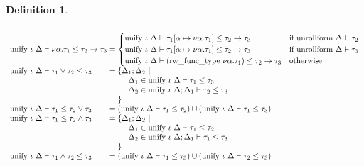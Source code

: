 \documentclass[manuscript]{acmart}
\theoremstyle{definition}
\newtheorem{definition}{Definition}[section]
\begin{document}
\begin{definition}
\[\begin{array}{l @{} l}
    \\
    \text{unify } \iota\ \Delta \vdash
    \nu \alpha . \tau_1 \leq 
    \tau_2 \rightarrow \tau_3
    &{} = 
    \begin{cases}
      \text{unify } \iota\ \Delta \vdash
      \tau_1[\alpha\mapsto\nu\alpha.\tau_1]
      \leq 
      \tau_2 \rightarrow \tau_3
      &\text{if }
      \text{unrollform } \Delta \vdash \tau_2
      \\
      \text{unify } \iota\ \Delta \vdash
      \tau_1[\alpha\mapsto\nu\alpha.\tau_1]
      \leq 
      \tau_2 \rightarrow \tau_3
      &\text{if }
      \text{unrollform } \Delta \vdash \tau_3
      \\
      \text{unify } \iota\ \Delta \vdash
      (\text{rw\_func\_type}\ \nu\alpha.\tau_1)
      \leq 
      \tau_2 \rightarrow \tau_3
      &\text{otherwise }
    \end{cases}

    \\
    \text{unify } \iota\ \Delta \vdash
    \tau_1 \vee \tau_2 \leq \tau_3
    &{} = 
    \begin{array}[t]{@{} l}
      \{\Delta_1;\Delta_2\ |
      \\ 
      \ \ \ \ \Delta_1 \in \text{unify } \iota\ \Delta \vdash \tau_1 \leq \tau_3
      \\
      \ \ \ \ \Delta_2 \in \text{unify } \iota\ \Delta;\Delta_1 \vdash \tau_2 \leq \tau_3
      \\
      \}
    \end{array}

    \\
    \text{unify } \iota\ \Delta \vdash
    \tau_1 \leq \tau_2 \vee \tau_3
    &{} = 
    (\text{unify } \iota\ \Delta \vdash \tau_1 \leq \tau_2)
    \cup
    (\text{unify } \iota\ \Delta \vdash \tau_1 \leq \tau_3)

    \\
    \text{unify } \iota\ \Delta \vdash
    \tau_1 \leq \tau_2 \wedge \tau_3
    &{} = 
    \begin{array}[t]{@{} l}
      \{\Delta_1;\Delta_2\ |
      \\ 
      \ \ \ \ \Delta_1 \in \text{unify } \iota\ \Delta \vdash \tau_1 \leq \tau_2
      \\
      \ \ \ \ \Delta_2 \in \text{unify } \iota\ \Delta;\Delta_1 \vdash \tau_1 \leq \tau_3
      \\
      \}
    \end{array}

    \\
    \text{unify } \iota\ \Delta \vdash
    \tau_1 \wedge \tau_2 \leq \tau_3
    &{} = 
    (\text{unify } \iota\ \Delta \vdash \tau_1 \leq \tau_3)
    \cup
    (\text{unify } \iota\ \Delta \vdash \tau_2 \leq \tau_3)

  \end{array}
\]
\end{definition}
\end{document}
